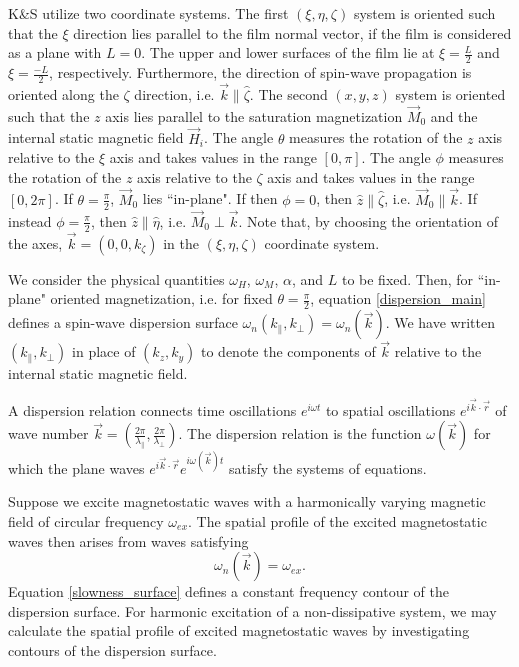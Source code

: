 \documentclass{article}
\begin{document}
K\&{}S utilize two coordinate systems. The first $(\xi,\eta,\zeta)$ system is oriented such that the $\xi$ direction lies parallel to the film normal vector, if the film is considered as a plane with $L=0$. The upper and lower surfaces of the film lie at $\xi = \frac{L}{2}$ and $\xi = \frac{-L}{2}$, respectively. Furthermore, the direction of spin-wave propagation is oriented along the $\zeta$ direction, i.e. $\vec{k} \parallel \hat{\zeta}$. The second $(x,y,z)$ system is oriented such that the $z$ axis lies parallel to the saturation magnetization $\vec{M}_{0}$ and the internal static magnetic field $\vec{H}_{i}$. The angle $\theta$ measures the rotation of the $z$ axis relative to the $\xi$ axis and takes values in the range $[0,\pi]$. The angle $\phi$ measures the rotation of the $z$ axis relative to the $\zeta$ axis and takes values in the range $[0, 2 \pi]$. If $\theta = \frac{\pi}{2}$, $\vec{M}_{0}$ lies ``in-plane". If then $\phi = 0$, then $\hat{z} \parallel \hat{\zeta}$, i.e. $\vec{M}_{0} \parallel \vec{k}$. If instead $\phi = \frac{\pi}{2}$, then $\hat{z} \parallel \hat{\eta}$, i.e. $\vec{M}_{0} \perp \vec{k}$. Note that, by choosing the orientation of the axes, $\vec{k} = (0,0,k_{\zeta})$ in the $(\xi,\eta,\zeta)$ coordinate system.

We consider the physical quantities $\omega_{H}$, $\omega_{M}$, $\alpha$, and $L$ to be fixed. Then, for ``in-plane" oriented magnetization, i.e. for fixed $\theta = \frac{\pi}{2}$, equation \eqref{dispersion_main} defines a spin-wave dispersion surface $\omega_{n} \left(k_{\parallel} , k_{\perp} \right) = \omega_{n} (\vec{k})$. We have written $\left( k_{\parallel}, k_{\perp} \right)$ in place of $\left( k_{z} , k_{y} \right)$ to denote the components of $\vec{k}$ relative to the internal static magnetic field.

A dispersion relation connects time oscillations $e^{i \omega t}$ to spatial oscillations $e^{i \vec{k} \cdot \vec{r}}$ of wave number $\vec{k} = (\frac{2 \pi}{\lambda_{\parallel}}, \frac{2 \pi}{\lambda_{\perp}})$. The dispersion relation is the function $\omega (\vec{k})$ for which the plane waves $e^{i \vec{k} \cdot \vec{r}} e^{i \omega (\vec{k}) t}$ satisfy the systems of equations.

Suppose we excite magnetostatic waves with a harmonically varying magnetic field of circular frequency $\omega_{ex}$. The spatial profile of the excited magnetostatic waves then arises from waves satisfying 
\begin{equation}\label{slowness_surface}
\omega_{n} (\vec{k}) = \omega_{ex}. 
\end{equation}
Equation \eqref{slowness_surface} defines a constant frequency contour of the dispersion surface. For harmonic excitation of a non-dissipative system, we may calculate the spatial profile of excited magnetostatic waves by investigating contours of the dispersion surface.
\end{document}
